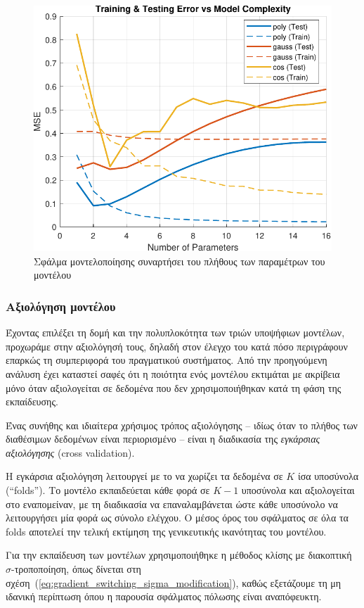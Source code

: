 \documentclass[a4paper,12pt]{article}
\begin{document}
\begin{figure}
    \centering
    \includegraphics[width=0.5\linewidth]{plot/task2_modeling_error_vs_model_complexity.pdf}
    \caption{Σφάλμα μοντελοποίησης συναρτήσει του πλήθους των παραμέτρων του μοντέλου}
    \label{fig:task2_modeling_error_vs_model_complexity}
\end{figure}

\subsubsection*{Αξιολόγηση μοντέλου}
Έχοντας επιλέξει τη δομή και την πολυπλοκότητα των τριών υποψήφιων μοντέλων, προχωράμε στην αξιολόγησή 
τους, δηλαδή στον έλεγχο του κατά πόσο περιγράφουν επαρκώς τη συμπεριφορά του πραγματικού συστήματος. 
Από την προηγούμενη ανάλυση έχει καταστεί σαφές ότι η ποιότητα ενός μοντέλου εκτιμάται με ακρίβεια μόνο 
όταν αξιολογείται σε δεδομένα που δεν χρησιμοποιήθηκαν κατά τη φάση της εκπαίδευσης.

Ένας συνήθης και ιδιαίτερα χρήσιμος τρόπος αξιολόγησης -- ιδίως όταν το πλήθος των διαθέσιμων δεδομένων 
είναι περιορισμένο -- είναι η διαδικασία της \textit{εγκάρσιας αξιολόγησης} 
(cross validation).

Η εγκάρσια αξιολόγηση λειτουργεί με το να χωρίζει τα δεδομένα σε $K$ ίσα υποσύνολα 
(``folds''). Το μοντέλο εκπαιδεύεται κάθε φορά σε $K-1$ 
υποσύνολα και αξιολογείται στο εναπομείναν, με τη διαδικασία να επαναλαμβάνεται ώστε κάθε υποσύνολο να 
λειτουργήσει μία φορά ως σύνολο ελέγχου. Ο μέσος όρος του σφάλματος σε όλα τα 
folds αποτελεί την τελική εκτίμηση της γενικευτικής 
ικανότητας του μοντέλου.

Για την εκπαίδευση των μοντέλων χρησιμοποιήθηκε η μέθοδος κλίσης με διακοπτική 
$\sigma$-τροποποίηση, όπως δίνεται στη σχέση~(\ref{eq:gradient_switching_sigma_modification}), 
καθώς εξετάζουμε τη μη ιδανική περίπτωση όπου η παρουσία σφάλματος πόλωσης είναι αναπόφευκτη.
\end{document}
